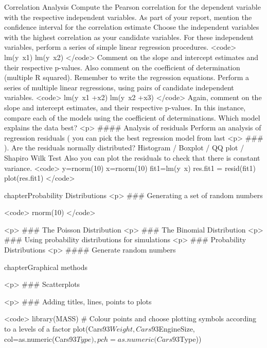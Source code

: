      {Correlation Analysis}
Compute the Pearson correlation for the dependent variable with the respective independent variables.  As part of your report, mention the confidence interval for the correlation estimate
Choose the independent variables with the highest correlation as your candidate variables.
For these independent variables, perform a series of simple linear regression procedures.
<code>
lm(y~x1)
lm(y~x2)
</code>
Comment on the slope and intercept estimates and their respective p-values. Also comment on the coefficient of determination (multiple R squared). Remember to write the regression equations.
Perform a series of multiple linear regressions, using pairs of candidate independent variables.
<code>
lm(y~x1 +x2)
lm(y~x2 +x3)
</code>
Again, comment on the slope and intercept estimates, and their respective p-values.
In this instance, compare each of the models using the coefficient of determinations. Which model explains the data best?
<p>
#### {Analysis of residuals}
Perform an analysis of regression residuals ( you can pick the best regression model from last <p>
### ).
Are the residuals normally distributed?
	Histogram /  Boxplot / QQ plot / Shapiro Wilk Test
Also you can plot the residuals to check that there is constant variance.
<code>
y=rnorm(10)
x=rnorm(10)
fit1=lm(y~x)
res.fit1 = resid(fit1)
plot(res.fit1)
</code>





chapter{Probability Distributions}
<p>
### {Generating a set of random numbers}

 <code>
rnorm(10)
</code>

<p>
### {The Poisson Distribution}
<p>
### {The Binomial Distribution}
<p>
### {Using probability distributions for simulations}
<p>
### {Probability Distributions}
<p>
#### {Generate random numbers }


chapter{Graphical methods}

<p>
### {Scatterplots}


<p>
### {Adding titles, lines, points to plots}


 <code>
library(MASS)
# Colour points and choose plotting symbols according to a levels of a factor
plot(Cars93$Weight, Cars93$EngineSize, col=as.numeric(Cars93$Type),
pch=as.numeric(Cars93$Type))


